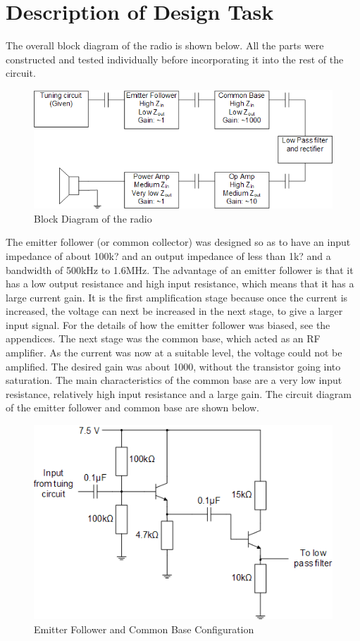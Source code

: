 \documentclass[a4paper,10pt]{report}
\begin{document}
\chapter{Description of Design Task}
The overall block diagram of the radio is shown below.  All the parts
were constructed and tested individually before incorporating it into
the rest of the circuit.

\begin{figure}[htb]
  \centering
  \includegraphics[scale=0.5]{Block-diagram}
  \caption{Block Diagram of the radio}
\end{figure}

The emitter follower (or common collector) was designed so as to have
an input impedance of about 100k? and an output impedance of less than
1k? and a bandwidth of 500kHz to 1.6MHz.  The advantage of an emitter
follower is that it has a low output resistance and high input
resistance, which means that it has a large current gain.  It is the
first amplification stage because once the current is increased, the
voltage can next be increased in the next stage, to give a larger
input signal.  For the details of how the emitter follower was biased,
see the appendices.  The next stage was the common base, which acted
as an RF amplifier.  As the current was now at a suitable level, the
voltage could not be amplified.  The desired gain was about 1000,
without the transistor going into saturation.  The main
characteristics of the common base are a very low input resistance,
relatively high input resistance and a large gain.  The circuit
diagram of the emitter follower and common base are shown below.

\begin{figure}[h]
  \centering
  \includegraphics[scale=0.45]{Emitter-follower}
  \caption{Emitter Follower and Common Base Configuration}
\end{figure}
\end{document}
